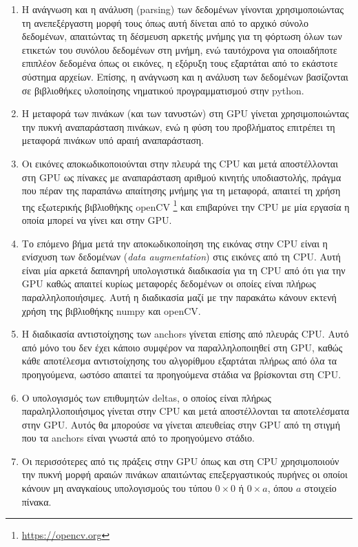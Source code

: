 \begin{enumerate}
\label{enumerate:net_problems}
\item{Η ανάγνωση και η ανάλυση (parsing) των δεδομένων γίνονται χρησιμοποιώντας τη ανεπεξέργαστη μορφή τους όπως αυτή δίνεται από το αρχικό σύνολο δεδομένων, απαιτώντας τη δέσμευση αρκετής μνήμης για τη φόρτωση όλων των ετικετών του συνόλου δεδομένων στη μνήμη, ενώ ταυτόχρονα για οποιαδήποτε επιπλέον δεδομένα όπως οι εικόνες, η εξόρυξη τους εξαρτάται από το εκάστοτε σύστημα αρχείων. Επίσης, η ανάγνωση και η ανάλυση των δεδομένων βασίζονται σε βιβλιοθήκες υλοποίησης νηματικού προγραμματισμού στην python.}
\item{Η μεταφορά των πινάκων (και των τανυστών) στη GPU γίνεται χρησιμοποιώντας την πυκνή αναπαράσταση πινάκων, ενώ η φύση του προβλήματος επιτρέπει τη μεταφορά πινάκων υπό αραιή αναπαράσταση.}
\item{Οι εικόνες αποκωδικοποιούνται στην πλευρά της CPU και μετά αποστέλλονται στη GPU ως πίνακες με αναπαράσταση αριθμού κινητής υποδιαστολής, πράγμα που πέραν της παραπάνω απαίτησης μνήμης για τη μεταφορά, απαιτεί τη χρήση της εξωτερικής βιβλιοθήκης openCV \footnote{\url{https://opencv.org}} και επιβαρύνει την CPU με μία εργασία η οποία μπορεί να γίνει και στην GPU.}
\item{Το επόμενο βήμα μετά την αποκωδικοποίηση της εικόνας στην CPU είναι η ενίσχυση των δεδομένων (\textit{data augmentation}) στις εικόνες από τη CPU. Αυτή είναι μία αρκετά δαπανηρή υπολογιστικά διαδικασία για τη CPU από ότι για την GPU καθώς απαιτεί κυρίως μεταφορές δεδομένων οι οποίες είναι πλήρως παραλληλοποιήσιμες. Αυτή η διαδικασία μαζί με την παρακάτω κάνουν εκτενή χρήση της βιβλιοθήκης numpy και openCV.}
\item{Η διαδικασία αντιστοίχησης των anchors γίνεται επίσης από πλευράς CPU. Αυτό από μόνο του δεν έχει κάποιο συμφέρον να παραλληλοποιηθεί στη GPU, καθώς κάθε αποτέλεσμα αντιστοίχησης του αλγορίθμου εξαρτάται πλήρως από όλα τα προηγούμενα, ωστόσο απαιτεί τα προηγούμενα στάδια να βρίσκονται στη CPU.}
\item{Ο υπολογισμός των επιθυμητών deltas, ο οποίος είναι πλήρως παραληλλοποιήσιμος γίνεται στην CPU και μετά αποστέλλονται τα αποτελέσματα στην GPU. Αυτός θα μπορούσε να γίνεται απευθείας στην GPU από τη στιγμή που τα anchors είναι γνωστά από το προηγούμενο στάδιο.}
\item{Οι περισσότερες από τις πράξεις στην GPU όπως και στη CPU χρησιμοποιούν την πυκνή μορφή αραιών πινάκων απαιτώντας επεξεργαστικούς πυρήνες οι οποίοι κάνουν μη αναγκαίους υπολογισμούς του τύπου $ 0 \times 0 $ ή $ 0 \times a $, όπου $a$ στοιχείο πίνακα.}

\end{enumerate}
